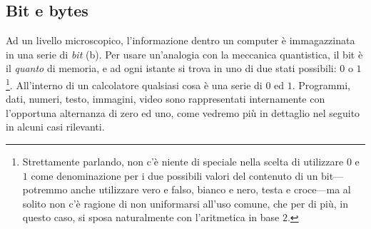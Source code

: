 \begin{table}[!htb]
\end{table}


\subsection{Bit e bytes}

Ad un livello microscopico, l'informazione dentro un computer \`e immagazzinata in
una serie di \emph{bit} (b). Per usare un'analogia con la meccanica quantistica, il bit
\`e il \emph{quanto} di memoria, e ad ogni istante si trova in uno di due stati
possibili: $0$ o $1$\footnote{Strettamente parlando, non c'\`e niente di speciale nella
scelta di utilizzare $0$ e $1$ come denominazione per i due possibili valori del contenuto
di un bit---potremmo anche utilizzare vero e falso, bianco e nero, testa e croce---ma
al solito non c'\`e ragione di non uniformarsi all'uso comune, che per di pi\`u, in
questo caso, si sposa naturalmente con l'aritmetica in base $2$.}. All'interno di un
calcolatore qualsiasi cosa \`e una serie di $0$ ed $1$. Programmi, dati, numeri,
testo, immagini, video sono rappresentati internamente con l'opportuna alternanza di
zero ed uno, come vedremo pi\`u in dettaglio nel seguito in alcuni casi rilevanti.

